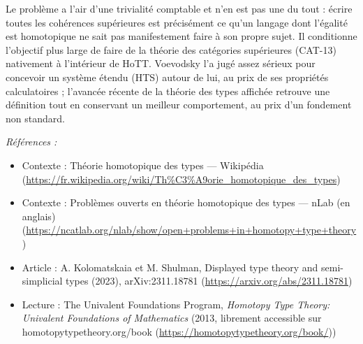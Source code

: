 \documentclass[11pt]{article}
\newenvironment{refs}{\par\small\noindent\emph{Références :}\begin{itemize}\setlength\itemsep{0pt}}{\end{itemize}\normalsize}
\begin{document}
\noindent Le problème a l'air d'une trivialité comptable et n'en est pas une du tout :
écrire \og{} toutes les cohérences supérieures \fg{} est précisément ce qu'un langage dont l'égalité est
homotopique ne sait pas manifestement faire à son propre sujet. Il conditionne l'objectif plus
large de faire de la théorie des catégories supérieures (CAT-13) nativement à l'intérieur de HoTT.
Voevodsky l'a jugé assez sérieux pour concevoir un système étendu (HTS) autour de lui, au prix de
ses propriétés calculatoires ; l'avancée récente de la théorie des types affichée retrouve une
définition tout en conservant un meilleur comportement, au prix d'un fondement non standard.

\begin{refs}
\item Contexte : Théorie homotopique des types --- Wikipédia (\url{https://fr.wikipedia.org/wiki/Th%C3%A9orie_homotopique_des_types})
\item Contexte : Problèmes ouverts en théorie homotopique des types --- nLab (en anglais) (\url{https://ncatlab.org/nlab/show/open+problems+in+homotopy+type+theory})
\item Article : A. Kolomatskaia et M. Shulman, \og{} Displayed type theory and semi-simplicial types \fg{} (2023), arXiv:2311.18781 (\url{https://arxiv.org/abs/2311.18781})
\item Lecture : The Univalent Foundations Program, \textit{Homotopy Type Theory: Univalent Foundations of Mathematics} (2013, librement accessible sur homotopytypetheory.org/book (\url{https://homotopytypetheory.org/book/}))
\end{refs}

\bigskip
\end{document}
